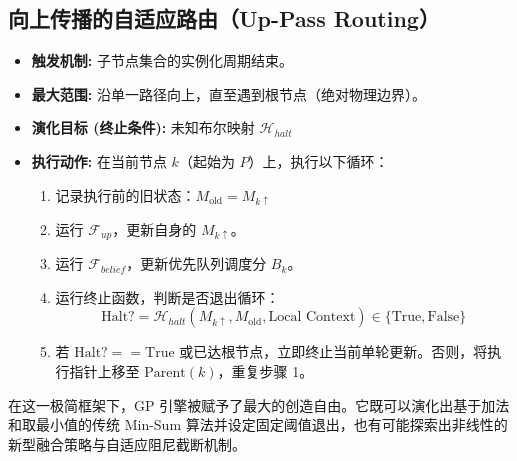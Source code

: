 \subsection{向上传播的自适应路由（Up-Pass Routing）}
\begin{itemize}
    \item \textbf{触发机制:} 子节点集合的实例化周期结束。
    \item \textbf{最大范围:} 沿单一路径向上，直至遇到根节点（绝对物理边界）。
    \item \textbf{演化目标 (终止条件):} 未知布尔映射 $\mathcal{H}_{halt}$
    \item \textbf{执行动作:} 
    在当前节点 $k$（起始为 $P$）上，执行以下循环：
    \begin{enumerate}
        \item 记录执行前的旧状态：$M_{\text{old}} = M_{k \uparrow}$
        \item 运行 $\mathcal{F}_{up}$，更新自身的 $M_{k \uparrow}$。
        \item 运行 $\mathcal{F}_{belief}$，更新优先队列调度分 $B_k$。
        \item 运行终止函数，判断是否退出循环：
        \[
        \text{Halt?} = \mathcal{H}_{halt}\left( M_{k \uparrow}, M_{\text{old}}, \text{Local Context} \right) \in \{\text{True}, \text{False}\}
        \]
        \item 若 $\text{Halt?} == \text{True}$ 或已达根节点，立即终止当前单轮更新。否则，将执行指针上移至 $\text{Parent}(k)$，重复步骤 1。
    \end{enumerate}
\end{itemize}

在这一极简框架下，GP 引擎被赋予了最大的创造自由。它既可以演化出基于加法和取最小值的传统 Min-Sum 算法并设定固定阈值退出，也有可能探索出非线性的新型融合策略与自适应阻尼截断机制。

